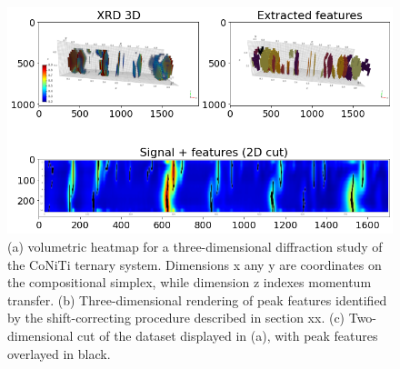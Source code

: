 \documentclass[12pt]{iopart}
\begin{document}
\begin{figure}[h!]
  \centering
    \includegraphics[width=\linewidth]{paper_figures/pkg/6.png}
  \caption{(a) volumetric heatmap for a three-dimensional diffraction study of the CoNiTi ternary system. Dimensions x any y are coordinates on the compositional simplex, while dimension z indexes momentum transfer. (b) Three-dimensional rendering of peak features identified by the shift-correcting procedure described in section xx. (c) Two-dimensional cut of the dataset displayed in (a), with peak features overlayed in black.}
  \label{fig:6}
\end{figure}
\end{document}

